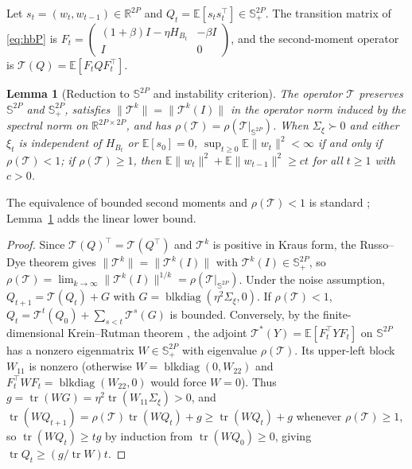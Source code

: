 \documentclass[11pt]{article}
\newtheorem{lemma}[theorem]{Lemma}
\theoremstyle{remark}
\newcommand{\E}{\mathbb{E}}
\newcommand{\R}{\mathbb{R}}
\newcommand{\tr}{\operatorname{tr}}
\begin{document}
Let $s_t = (w_t, w_{t-1}) \in \R^{2P}$ and $Q_t = \E[s_t s_t^\top] \in \mathbb S^{2P}_+$. The transition matrix of \eqref{eq:hbP} is $F_t = \begin{pmatrix}(1+\beta)I - \eta H_{B_t} & -\beta I \\ I & 0\end{pmatrix}$, and the second-moment operator is $\mathcal T(Q) = \E[F_t Q F_t^\top]$.

\begin{lemma}[Reduction to $\mathbb S^{2P}$ and instability criterion]\label{lem:russodye}
The operator $\mathcal T$ preserves $\mathbb S^{2P}$ and $\mathbb S^{2P}_+$, satisfies $\|\mathcal T^k\| = \|\mathcal T^k(I)\|$ in the operator norm induced by the spectral norm on $\R^{2P\times 2P}$, and has $\rho(\mathcal T) = \rho(\mathcal T|_{\mathbb S^{2P}})$. When $\Sigma_\xi \succ 0$ and either $\xi_t$ is independent of $H_{B_t}$ or $\E[s_0] = 0$, $\sup_{t\ge 0}\E\|w_t\|^2 < \infty$ if and only if $\rho(\mathcal T) < 1$; if $\rho(\mathcal T) \ge 1$, then $\E\|w_t\|^2 + \E\|w_{t-1}\|^2 \ge c t$ for all $t \ge 1$ with $c > 0$.
\end{lemma}
The equivalence of bounded second moments and $\rho(\mathcal T)<1$ is standard \citep[Chapter~3]{costa2005mjls}; Lemma~\ref{lem:russodye} adds the linear lower bound.
\begin{proof}
Since $\mathcal T(Q)^\top = \mathcal T(Q^\top)$ and $\mathcal T^k$ is positive in Kraus form, the Russo--Dye theorem gives $\|\mathcal T^k\| = \|\mathcal T^k(I)\|$ with $\mathcal T^k(I) \in \mathbb S^{2P}_+$, so $\rho(\mathcal T) = \lim_{k\to\infty}\|\mathcal T^k(I)\|^{1/k} = \rho(\mathcal T|_{\mathbb S^{2P}})$. Under the noise assumption, $Q_{t+1} = \mathcal T(Q_t) + G$ with $G = \operatorname{blkdiag}(\eta^2\Sigma_\xi, 0)$. If $\rho(\mathcal T) < 1$, $Q_t = \mathcal T^t(Q_0) + \sum_{s<t}\mathcal T^s(G)$ is bounded. Conversely, by the finite-dimensional Krein--Rutman theorem \citep[Thm.~1.3.2]{berman1994}, the adjoint $\mathcal T^*(Y) = \E[F_t^\top Y F_t]$ on $\mathbb S^{2P}$ has a nonzero eigenmatrix $W \in \mathbb S^{2P}_+$ with eigenvalue $\rho(\mathcal T)$. Its upper-left block $W_{11}$ is nonzero (otherwise $W = \operatorname{blkdiag}(0, W_{22})$ and $F_t^\top W F_t = \operatorname{blkdiag}(W_{22},0)$ would force $W=0$). Thus $g = \tr(W G) = \eta^2\tr(W_{11}\Sigma_\xi) > 0$, and $\tr(W Q_{t+1}) = \rho(\mathcal T)\tr(W Q_t) + g \ge \tr(W Q_t) + g$ whenever $\rho(\mathcal T) \ge 1$, so $\tr(W Q_t) \ge t g$ by induction from $\tr(W Q_0) \ge 0$, giving $\tr Q_t \ge (g/\tr W)t$.
\end{proof}
\end{document}
